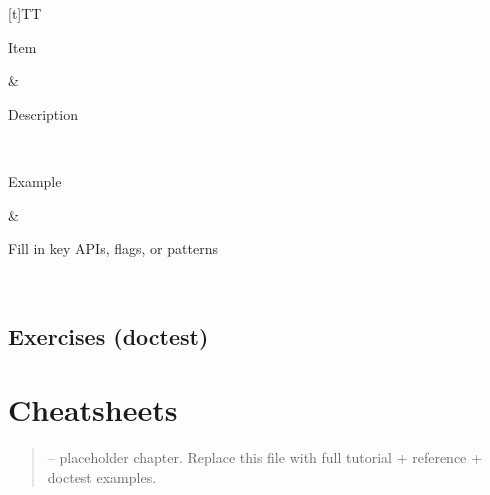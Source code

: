 \documentclass[a4paper,11pt,english]{sphinxmanual}
\begin{document}
\begin{savenotes}\sphinxattablestart
\sphinxthistablewithglobalstyle
\centering
\begin{tabulary}{\linewidth}[t]{TT}
\sphinxtoprule
\begin{varwidth}[t]{}
\sphinxstyletheadfamily \sphinxAtStartPar
Item
\sphinxbeforeendvarwidth
\end{varwidth}%
&\begin{varwidth}[t]{}
\sphinxstyletheadfamily \sphinxAtStartPar
Description
\sphinxbeforeendvarwidth
\end{varwidth}%
\\
\sphinxmidrule
\sphinxtableatstartofbodyhook\begin{varwidth}[t]{}
\sphinxAtStartPar
Example
\sphinxbeforeendvarwidth
\end{varwidth}%
&\begin{varwidth}[t]{}
\sphinxAtStartPar
Fill in key APIs, flags, or patterns
\sphinxbeforeendvarwidth
\end{varwidth}%
\\
\sphinxbottomrule
\end{tabulary}
\sphinxtableafterendhook\par
\sphinxattableend\end{savenotes}


\subsection{Exercises (doctest)}
\label{\detokenize{tooling/task_runners:exercises-doctest}}
\begin{sphinxVerbatim}[commandchars=\\\{\}]
\end{sphinxVerbatim}

\sphinxstepscope


\section{Cheatsheets}
\label{\detokenize{appendices/cheatsheets:cheatsheets}}\label{\detokenize{appendices/cheatsheets::doc}}\begin{quote}

\sphinxAtStartPar
{} – placeholder chapter. Replace this file with full tutorial + reference + doctest examples.
\end{quote}
\end{document}
